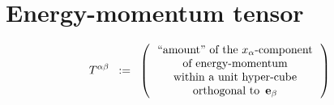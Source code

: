 

\section{Energy-momentum tensor}
\setcounter{theorem}{0}
\setcounter{equation}{0}


\renewcommand{\theenumi}{\roman{enumi}}
\renewcommand{\labelenumi}{\textnormal{(\theenumi)}$\;\;$}


\begin{equation*}
T^{\alpha\beta}
\;\; := \;\;
	\left(\,
		\begin{array}{c}
		\textnormal{``amount'' of the $x_{\alpha}$-component}
		\\
		\textnormal{of energy-momentum}
		\\
		\textnormal{within a unit hyper-cube}
		\\
		\textnormal{orthogonal to \,$\mathbf{e}_{\beta}$}
		\end{array}
		\,\right)
\end{equation*}

